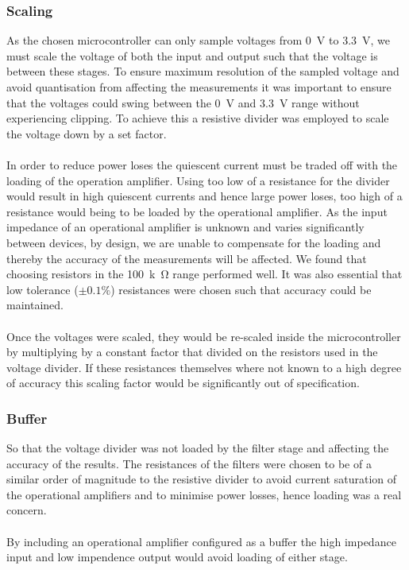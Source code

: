 \subsubsection{Scaling}
As the chosen microcontroller can only sample voltages from \SI{0}{V} to \SI{3.3}{V}, we must scale the voltage of both the input and output such that the voltage is between these stages. To ensure maximum resolution of the sampled voltage and avoid quantisation from affecting the measurements it was important to ensure that the voltages could swing between the \SI{0}{V} and \SI{3.3}{V} range without experiencing clipping. To achieve this a resistive divider was employed to scale the voltage down by a set factor.
\\ \\
In order to reduce power loses the quiescent current must be traded off with the loading of the operation amplifier. Using too low of a resistance for the divider would result in high quiescent currents and hence large power loses, too high of a resistance would being to be loaded by the operational amplifier. As the input impedance of an operational amplifier is unknown and varies significantly between devices, by design, we are unable to compensate for the loading and thereby the accuracy of the measurements will be affected. We found that choosing resistors in the \SI{100}{k\ohm} range performed well. It was also essential that low tolerance ($\pm0.1 \%$) resistances were chosen such that accuracy could be maintained.
\\ \\
Once the voltages were scaled, they would be re-scaled inside the microcontroller by multiplying by a constant factor that divided on the resistors used in the voltage divider. If these resistances themselves where not known to a high degree of accuracy this scaling factor would be significantly out of specification.

\subsubsection{Buffer}
So that the voltage divider was not loaded by the filter stage and affecting the accuracy of the results. The resistances of the filters were chosen to be of a similar order of magnitude to the resistive divider to avoid current saturation of the operational amplifiers and to minimise power losses, hence loading was a real concern.
\\ \\
By including an operational amplifier configured as a buffer the high impedance input and low impendence output would avoid loading of either stage.


